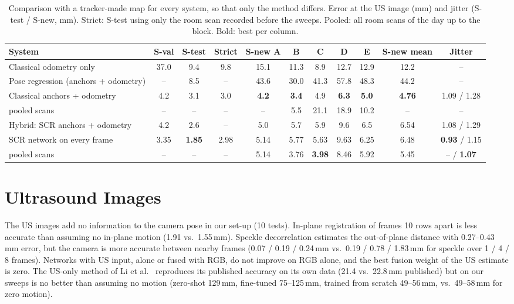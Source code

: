 \documentclass[journal]{IEEEtran}
\newcommand{\Sval}{S-val}
\newcommand{\Stest}{S-test}
\newcommand{\Snew}{S-new}
\begin{document}
\begin{table}[t]
  \caption{Comparison with a tracker-made map for every system, so that only the method differs. Error at the US image (mm) and jitter (\Stest{} / \Snew{}, mm). Strict: \Stest{} using only the room scan recorded before the sweeps. Pooled: all room scans of the day up to the block. Bold: best per column.}
  \label{tab:s_compare}
  \centering
  \scriptsize
  \setlength{\tabcolsep}{4pt}
  \begin{tabular}{@{}lcccccccccc@{}}
    \toprule
    System & \Sval & \Stest & Strict & \Snew{} A & B & C & D & E & \Snew{} mean & Jitter\\
    \midrule
    Classical odometry only & 37.0 & 9.4 & 9.8 & 15.1 & 11.3 & 8.9 & 12.7 & 12.9 & 12.2 & --\\
    Pose regression (anchors + odometry) & -- & 8.5 & -- & 43.6 & 30.0 & 41.3 & 57.8 & 48.3 & 44.2 & --\\
    Classical anchors + odometry & 4.2 & 3.1 & 3.0 & \textbf{4.2} & \textbf{3.4} & 4.9 & \textbf{6.3} & \textbf{5.0} & \textbf{4.76} & 1.09 / 1.28\\
    \quad pooled scans & -- & -- & -- & -- & 5.5 & 21.1 & 18.9 & 10.2 & -- & --\\
    Hybrid: SCR anchors + odometry & 4.2 & 2.6 & -- & 5.0 & 5.7 & 5.9 & 9.6 & 6.5 & 6.54 & 1.08 / 1.29\\
    SCR network on every frame & 3.35 & \textbf{1.85} & 2.98 & 5.14 & 5.77 & 5.63 & 9.63 & 6.25 & 6.48 & \textbf{0.93} / 1.15\\
    \quad pooled scans & -- & -- & -- & 5.14 & 3.76 & \textbf{3.98} & 8.46 & 5.92 & 5.45 & -- / \textbf{1.07}\\
    \bottomrule
  \end{tabular}
\end{table}

\section{Ultrasound Images}
\label{sec:s_us}
The US images add no information to the camera pose in our set-up (10 tests). In-plane registration of frames 10 rows apart is less accurate than assuming no in-plane motion (1.91 vs.\ 1.55\,mm). Speckle decorrelation estimates the out-of-plane distance with 0.27--0.43\,mm error, but the camera is more accurate between nearby frames (0.07 / 0.19 / 0.24\,mm vs.\ 0.19 / 0.78 / 1.83\,mm for speckle over 1 / 4 / 8 frames). Networks with US input, alone or fused with RGB, do not improve on RGB alone, and the best fusion weight of the US estimate is zero. The US-only method of Li et al.\ \cite{li2024longterm} reproduces its published accuracy on its own data (21.4 vs.\ 22.8\,mm published) but on our sweeps is no better than assuming no motion (zero-shot 129\,mm, fine-tuned 75--125\,mm, trained from scratch 49--56\,mm, vs.\ 49--58\,mm for zero motion).
\end{document}
